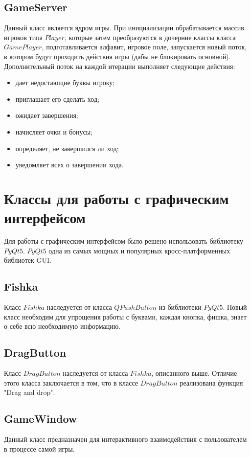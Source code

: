 \documentclass[a4paper,14pt]{article}
\begin{document}
	\subsection{GameServer}
	Данный класс является ядром игры. 
	При инициализации обрабатывается массив игроков типа $Player$, которые затем преобразуются в дочерние классы класса $GamePlayer$, подготавливается алфавит, игровое поле, запускается новый поток, в котором будут проходить действия игры (дабы не блокировать основной). 
	Дополнительный поток на каждой итерации выполняет следующие действия:
	
	\begin {itemize}
		\item дает недостающие буквы игроку;
		\item приглашает его сделать ход;
		\item ожидает завершения;
		\item начисляет очки и бонусы;
		\item определяет, не завершился ли ход;	
		\item уведомляет всех о завершении хода.
	\end {itemize}

	
\section{Классы для работы с графическим интерфейсом}
Для работы с графическим интерфейсом было решено использовать библиотеку $PyQt5$. 
$PyQt5$ одна из самых мощных и популярных кросс-платформенных библиотек GUI.
	\subsection{Fishka}
	Класс $Fishka$ наследуется от класса $QPushButton$ из библиотеки $PyQt5$. 
	Новый класс необходим для упрощения работы с буквами, каждая кнопка, фишка, знает о себе всю необходимую информацию.
	\subsection{DragButton}
	Класс $DragButton$ наследуется от класса $Fishka$, описанного выше. Отличие этого класса заключается в том, что в классе $DragButton$ реализована функция "Drag and drop". 
	\subsection{GameWindow}
	Данный класс предназначен для интерактивного взаимодействия с пользователем в процессе самой игры.
	
\end{document}
